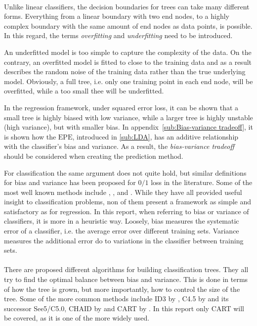 \\
Unlike linear classifiers, the decision boundaries for trees can take many different forms. Everything from a linear boundary with two end nodes, to a highly complex boundary with the same amount of end nodes as data points, is possible. In this regard, the terms \textit{overfitting} and \textit{underfitting} need to be introduced. 

An underfitted model is too simple to capture the complexity of the data. On the contrary, an overfitted model is fitted to close to the training data and as a result describes the random noise of the training data rather than the true underlying model.  Obviously, a full tree, i.e. only one training point in each end node, will be overfitted, while a too small thee will be underfitted. 

In the regression framework, under squared error loss, it can be shown that a small tree is highly biased with low variance, while a larger tree is highly unstable (high variance), but with smaller bias. 
In appendix~\ref{sub:Bias-variance tradeoff}, it is shown how the $\mathrm{EPE}$, introduced in \ref{sub:LDA}, has an additive relationship with the classifier's bias and variance. As a result, the \textit{bias-variance tradeoff} should be considered when creating the prediction method. 

For classification the same argument does not quite hold, but similar definitions for bias and variance has been proposed for $0/1$ loss in the literature. Some of the most well known methods include \cite{kong1995error}, \cite{kohavi1996bias}, \cite{breiman1996bias} and \cite{Friedman1997bias}. While they have all provided useful insight to classification problems, non of them present a framework as simple and satisfactory as for regression. In this report, when referring to bias or variance of classifiers, it is more in a heuristic way. Loosely, bias measures the systematic error of a classifier, i.e. the average error over different training sets. Variance measures the additional error do to variations in the classifier between training sets. 
\\
\\
There are proposed different algorithms for building classification trees. They all try to find the optimal balance between bias and variance. This is done in terms of how the tree is grown, but more importantly, how to control the size of the tree. 
Some of the more common methods include ID3 by \cite{ID3}, C4.5 by \cite{C4.5} and its successor See5/C5.0, CHAID by \cite{CHAID} and CART by \cite{breiman}.
In this report only CART will be covered, as it is one of the more widely used.
%
